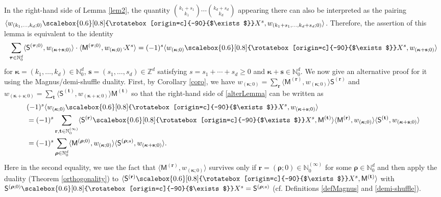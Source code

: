 \documentclass[ALCO,Unicode,published]{cedram}
\def\MM{{\mathsf{M}}}
\def\SS{{\mathsf{S}}}
\def\bt{{\mathbf{t}}}
\def\bs{{\mathbf{s}}}
\def\bbr{{\mathbf{r}}}
\def\bkappa{{\boldsymbol \kappa}}
\def\btau{{\boldsymbol \tau}}
\def\brho{{\boldsymbol \rho}}
\def\lp{\langle}
\def\rp{\rangle}
\def\N{{\mathbb N}}
\def\Z{{\mathbb Z}}
\def\la{\langle}
\def\ra{\rangle}
\def\bkappa{{\boldsymbol \kappa}}
\def\brho{{\boldsymbol \rho}}
\def\sha{\scalebox{0.6}[0.8]{\rotatebox[origin=c]{-90}{$\exists$}}}
\begin{document}
\begin{Note} \label{Quest4.3}
In the right-hand side of Lemma \ref{lem2}, the quantity
$\binom{k_1+s_1}{k_1}\cdots \binom{k_d+s_d}{k_d}$ appearing there can also be interpreted as
the pairing
$\lp w_{(k_1,\dots,k_d;0)}\sha X^s, w_{(k_1+s_1,\dots,k_d+s_d;0)} \rp$.
Therefore, the assertion of this lemma is equivalent to the identity
\begin{equation}
\sum_{\btau\in\N_0^d} 
\lp\SS^{(\btau;0)},w_{(\bkappa+\bs;0)} \rp \cdot \lp\MM^{(\btau;0)}, w_{(\bkappa;0)}\!\cdot\!\! X^s\rp
=(-1)^s 
\lp w_{(\bkappa;0)}\sha X^s, w_{(\bkappa+\bs;0)} \rp
\label{alterLemma}
\end{equation}
for $\bkappa=(k_1,\dots,k_d)\in\N_0^d$, $\bs=(s_1,\dots,s_d)\in\Z^d$ 
satisfying $s=s_1+\cdots+s_d\ge 0$ and $\bkappa+\bs\in\N_0^d$.
We now give an alternative proof for it using the Magnus/demi-shuffle duality.
First, by Corollary \ref{coro}, we have 
$w_{(\bkappa;0)}=\sum_\bbr\la \MM^{(\bbr)},w_{(\bkappa;0)}\ra \SS^{(\bbr)}$ 
and $w_{(\bkappa+\bs;0)}=\sum_\bt\la \SS^{(\bt)},w_{(\bkappa+\bs;0)}\ra \MM^{(\bt)}$
so that the right-hand side of \eqref{alterLemma} can be written as
\begin{align}
\label{RHS4.2}
&(-1)^s 
\lp w_{(\bkappa;0)}\sha X^s, w_{(\bkappa+\bs;0)} \rp \\
&=(-1)^s \sum_{\bbr,\bt\in\N_0^{(\infty)}}
\lp \SS^{(\bbr)}\sha X^s, \MM^{(\bt)} \rp
\lp \MM^{(\bbr)} ,w_{(\bkappa;0)} \rp
\lp \SS^{(\bt)} ,w_{(\bkappa+\bs;0)}\rp
\notag \\
&=(-1)^s \sum_{\brho\in\N_0^d} 
\lp \MM^{(\brho;0)} ,w_{(\bkappa;0)}\rp
\lp  \SS^{(\brho;s)}, w_{(\bkappa+\bs;0)} \rp.
\notag
\end{align}
Here in the second equality, we use the fact that
$\lp  \MM^{(\bbr)}, w_{(\bkappa;0)} \rp$ 
survives only if $\bbr=(\brho;0)\in\N_0^{(\infty)}$ for some $\brho\in\N_0^d$
and then apply the duality (Theorem \ref{orthogonality})
to $\lp \SS^{(\bbr)}\sha X^s, \MM^{(\bt)} \rp$
with $\SS^{(\brho;0)}\sha X^s=\SS^{(\brho;s)}$ 
(cf. Definitions \ref{defMagnus} and \ref{demi-shuffle}).


\end{Note}
\end{document}
